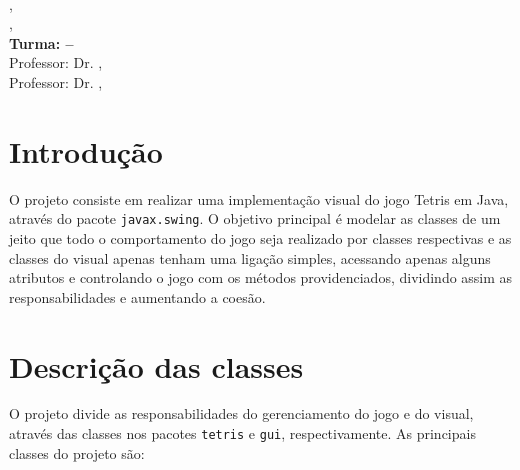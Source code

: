 \documentclass[a4paper, 12pt]{article}
\title{\titulo}
\author{\nomeAutorUm e \nomeAutorDois}
\date{\today}
\makeatletter
\newcommand{\printtitle}{
  \begin{center}
    {\Large \scshape \titulo}\\[1em]
    {\nomeAutorUm, \raAutorUm}\\   
    {\nomeAutorDois, \raAutorDois}\\   
    {\bfseries Turma: \turma{} -- \periodo}\\[0.5em]
    Professor: Dr\@. \nomeProfessorUm, \centroProfessor\\
    Professor: Dr\@. \nomeProfessorDois, \centroProfessor\\    
    {\itshape \campusFaculdade}
  \end{center}
}
\makeatother
\begin{document}
  \printtitle

  \section{Introdução}

  O projeto consiste em realizar uma implementação visual 
  do jogo Tetris em Java, através do pacote \texttt{javax.swing}.
  O objetivo principal é modelar as classes de um jeito que
  todo o comportamento do jogo seja realizado por classes
  respectivas e as classes do visual apenas tenham uma
  ligação simples, acessando apenas alguns atributos e
  controlando o jogo com os métodos providenciados, dividindo
  assim as responsabilidades e aumentando a coesão.

  \section{Descrição das classes}

  O projeto divide as responsabilidades do gerenciamento
  do jogo e do visual, através das classes nos pacotes
  \texttt{tetris} e \texttt{gui}, respectivamente. As
  principais classes do projeto são:
\end{document}
